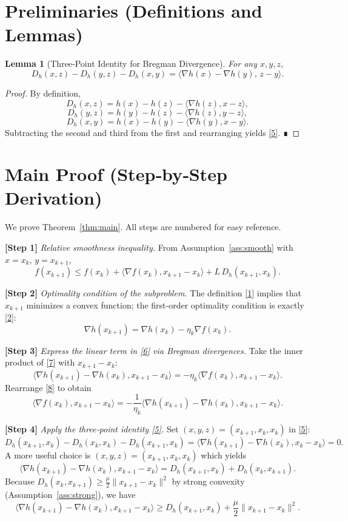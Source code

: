 \documentclass{article}
\newtheorem{lemma}{Lemma}
\newcommand{\grad}{\nabla}
\newcommand{\Breg}{D_{h}}
\begin{document}
\newpage
\section*{Preliminaries (Definitions and Lemmas)}
\begin{lemma}[Three‑Point Identity for Bregman Divergence]\label{lem:3pt}
For any $x,y,z$,
\[
\Breg (x,z)-\Breg (y,z)-\Breg (x,y)=\langle \grad h(x)-\grad h(y),\,z-y\rangle .
\tag{5}
\]
\end{lemma}
\begin{proof}
By definition,
\[
\Breg (x,z)=h(x)-h(z)-\langle \grad h(z),x-z\rangle,
\]
\[
\Breg (y,z)=h(y)-h(z)-\langle \grad h(z),y-z\rangle,
\]
\[
\Breg (x,y)=h(x)-h(y)-\langle \grad h(y),x-y\rangle .
\]
Subtracting the second and third from the first and rearranging yields \eqref{5}. ∎
\end{proof}

\section*{Main Proof (Step‑by‑Step Derivation)}
We prove Theorem~\ref{thm:main}. All steps are numbered for easy reference.

\bigskip
\noindent\textbf{[Step 1]} \emph{Relative smoothness inequality.}  
From Assumption~\ref{ass:smooth} with $x=x_k$, $y=x_{k+1}$,
\[
f(x_{k+1})\le f(x_k)+\langle \grad f(x_k),x_{k+1}-x_k\rangle+L\,\Breg (x_{k+1},x_k).
\tag{6}
\]

\noindent\textbf{[Step 2]} \emph{Optimality condition of the subproblem.}  
The definition \eqref{1} implies that $x_{k+1}$ minimizes a convex function; the first‑order optimality condition is exactly \eqref{2}:
\[
\grad h(x_{k+1}) = \grad h(x_k)-\eta_k\grad f(x_k).
\tag{7}
\]

\noindent\textbf{[Step 3]} \emph{Express the linear term in \eqref{6} via Bregman divergences.}  
Take the inner product of \eqref{7} with $x_{k+1}-x_k$:
\[
\langle \grad h(x_{k+1})-\grad h(x_k),x_{k+1}-x_k\rangle
   = -\eta_k \langle \grad f(x_k),x_{k+1}-x_k\rangle .
\tag{8}
\]
Rearrange \eqref{8} to obtain
\[
\langle \grad f(x_k),x_{k+1}-x_k\rangle
   = -\frac{1}{\eta_k}\langle \grad h(x_{k+1})-\grad h(x_k),x_{k+1}-x_k\rangle .
\tag{9}
\]

\noindent\textbf{[Step 4]} \emph{Apply the three‑point identity \eqref{5}.}  
Set $(x,y,z)=(x_{k+1},x_k,x_k)$ in \eqref{5}:
\[
\Breg (x_{k+1},x_k)-\Breg (x_k,x_k)-\Breg (x_{k+1},x_k)
   =\langle \grad h(x_{k+1})-\grad h(x_k),x_k-x_k\rangle=0 .
\]
A more useful choice is $(x,y,z)=(x_{k+1},x_k,x_k)$ which yields
\[
\langle \grad h(x_{k+1})-\grad h(x_k),x_{k+1}-x_k\rangle
   =\Breg (x_{k+1},x_k)+\Breg (x_k,x_{k+1}) .
\tag{10}
\]
Because $\Breg (x_k,x_{k+1})\ge \frac{\mu}{2}\|x_{k+1}-x_k\|^{2}$ by strong convexity (Assumption~\ref{ass:strong}), we have
\[
\langle \grad h(x_{k+1})-\grad h(x_k),x_{k+1}-x_k\rangle
   \ge \Breg (x_{k+1},x_k)+\frac{\mu}{2}\|x_{k+1}-x_k\|^{2}.
\tag{11}
\]
\end{document}

